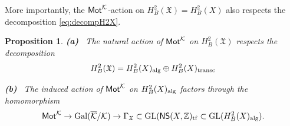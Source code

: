 \documentclass[twoside,leqno]{article}
\numberwithin{equation}{section}
\theoremstyle{plain}
\newtheorem{proposition}[equation]{Proposition}
\theoremstyle{definition}
\begin{document}
\medskip

More importantly, the $\mathsf{Mot}^{\mathcal K}$-action on
$H^{2}_{B}(\mathfrak{X}) = H^{2}_{B}(X)$ also respects the
decomposition \eqref {eq:decompH2X}.

\begin{proposition}
  {\bfseries (a)} \ 
  The natural action of $\mathsf{Mot}^{\mathcal K}$ on $H^{2}_{B}(\mathfrak{X})$
respects the
decomposition
\begin{equation} \label{eq:Mot-decompose}
H^{2}_{B}(\mathfrak{X}) = H^{2}_{B}(X)_{\operatorname{alg}} \oplus
H^{2}_{B}(X)_{\operatorname{transc}}
\end{equation}

\smallskip

\noindent
{\bfseries (b)} \
The induced action of $\mathsf{Mot}^{\mathcal K}$ on $H^{2}_{B}(X)_{\operatorname{alg}}$
factors through the homomorphism
\[
\mathsf{Mot}^{\mathcal K} \to \operatorname{Gal}(\overline{\mathcal K}/\mathcal K) \to \Gamma_{\mathfrak{X}}
\subset \operatorname{GL}(\mathsf{NS}(X,\mathbb Z)_{\operatorname{tf}} \subset \operatorname{GL}(H^{2}_{B}(X)_{\operatorname{alg}}).
\]
\end{proposition}
\end{document}
